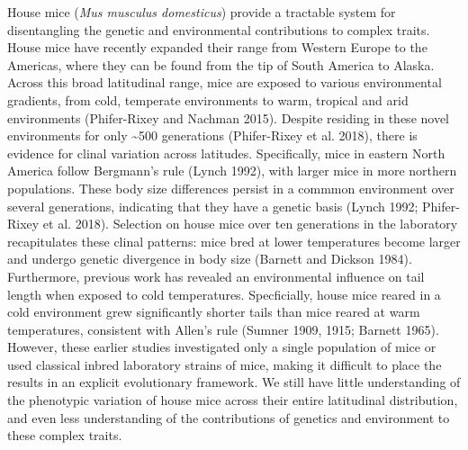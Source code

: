 \documentclass[]{article}
\begin{document}
House mice (\emph{Mus musculus domesticus}) provide a tractable system
for disentangling the genetic and environmental contributions to complex
traits. House mice have recently expanded their range from Western
Europe to the Americas, where they can be found from the tip of South
America to Alaska. Across this broad latitudinal range, mice are exposed
to various environmental gradients, from cold, temperate environments to
warm, tropical and arid environments (Phifer-Rixey and Nachman 2015).
Despite residing in these novel environments for only
\textasciitilde{}500 generations (Phifer-Rixey et al. 2018), there is
evidence for clinal variation across latitudes. Specifically, mice in
eastern North America follow Bergmann's rule (Lynch 1992), with larger
mice in more northern populations. These body size differences persist
in a commmon environment over several generations, indicating that they
have a genetic basis (Lynch 1992; Phifer-Rixey et al. 2018). Selection
on house mice over ten generations in the laboratory recapitulates these
clinal patterns: mice bred at lower temperatures become larger and
undergo genetic divergence in body size (Barnett and Dickson 1984).
Furthermore, previous work has revealed an environmental influence on
tail length when exposed to cold temperatures. Specficially, house mice
reared in a cold environment grew significantly shorter tails than mice
reared at warm temperatures, consistent with Allen's rule (Sumner 1909,
1915; Barnett 1965). However, these earlier studies investigated only a
single population of mice or used classical inbred laboratory strains of
mice, making it difficult to place the results in an explicit
evolutionary framework. We still have little understanding of the
phenotypic variation of house mice across their entire latitudinal
distribution, and even less understanding of the contributions of
genetics and environment to these complex traits.
\end{document}

